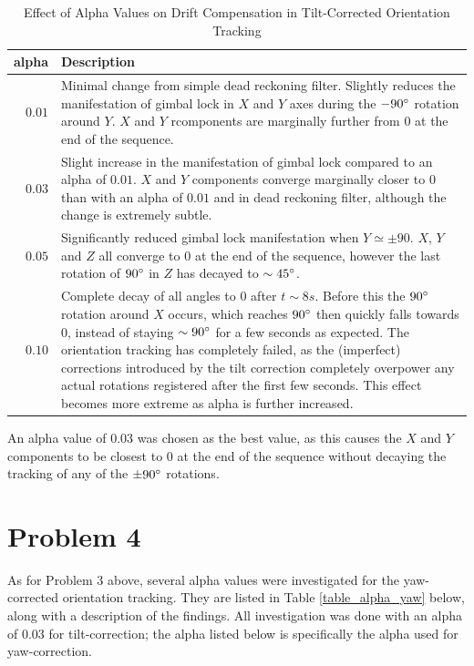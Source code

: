 \documentclass[11pt,a4paper]{article}
\begin{document}
	\begin{table}[h!]
		\caption{Effect of Alpha Values on Drift Compensation in Tilt-Corrected Orientation Tracking}
		\label{table_alpha_tilt}
		\begin{tabu} to 1.0\linewidth {|r|X[l]|}
			\hline
			alpha&Description\\
			\hline
			$0.01$&Minimal change from simple dead reckoning filter. Slightly reduces the manifestation of gimbal lock in $X$ and $Y$ axes during the $-90\degree$ rotation around $Y$. $X$ and $Y$ rcomponents are marginally further from $0$ at the end of the sequence.\\
			\hline
			$0.03$&Slight increase in the manifestation of gimbal lock compared to an alpha of $0.01$. $X$ and $Y$ components converge marginally closer to $0$ than with an alpha of $0.01$ and in dead reckoning filter, although the change is extremely subtle.\\
			\hline
			$0.05$&Significantly reduced gimbal lock manifestation when $Y \simeq \pm90$. $X$, $Y$ and $Z$ all converge to $0$ at the end of the sequence, however the last rotation of $90\degree$ in $Z$ has decayed to $\sim45\degree$.\\
			\hline
			$0.10$&Complete decay of all angles to $0$ after $t\sim8s$. Before this the $90\degree$ rotation around $X$ occurs, which reaches $90\degree$ then quickly falls towards $0$, instead of staying $\sim90\degree$ for a few seconds as expected. The orientation tracking has completely failed, as the (imperfect) corrections introduced by the tilt correction completely overpower any actual rotations registered after the first few seconds. This effect becomes more extreme as alpha is further increased.\\
			\hline
		\end{tabu}
	\end{table}
	
	\noindent An alpha value of $0.03$ was chosen as the best value, as this causes the $X$ and $Y$ components to be closest to $0$ at the end of the sequence without decaying the tracking of any of the $\pm90\degree$ rotations.

	\section*{Problem 4}
	
	As for Problem 3 above, several alpha values were investigated for the yaw-corrected orientation tracking. They are listed in Table \ref{table_alpha_yaw} below, along with a description of the findings. All investigation was done with an alpha of $0.03$ for tilt-correction; the alpha listed below is specifically the alpha used for yaw-correction.
	
\end{document}
